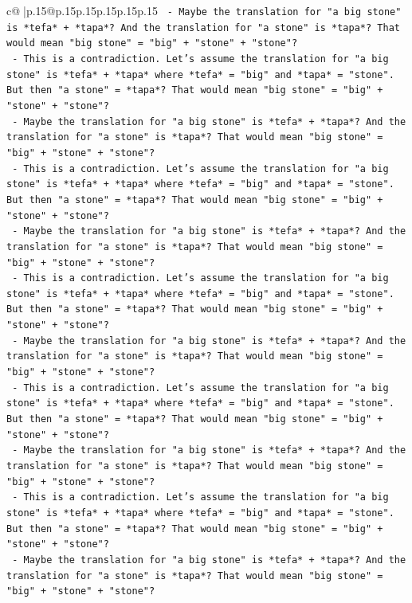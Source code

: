 \documentclass{article}
\begin{document}
{\begin{supertabular}{c@{$\;$}|p{.15\linewidth}@{}p{.15\linewidth}p{.15\linewidth}p{.15\linewidth}p{.15\linewidth}p{.15\linewidth}}
{{{\texttt{        {-} Maybe the translation for "a big stone" is *tefa* + *tapa*? And the translation for "a stone" is *tapa*? That would mean "big stone" = "big" + "stone" + "stone"?} \\
\texttt{        {-} This is a contradiction. Let's assume the translation for "a big stone" is *tefa* + *tapa* where *tefa* = "big" and *tapa* = "stone". But then "a stone" = *tapa*? That would mean "big stone" = "big" + "stone" + "stone"?} \\
\texttt{        {-} Maybe the translation for "a big stone" is *tefa* + *tapa*? And the translation for "a stone" is *tapa*? That would mean "big stone" = "big" + "stone" + "stone"?} \\
\texttt{        {-} This is a contradiction. Let's assume the translation for "a big stone" is *tefa* + *tapa* where *tefa* = "big" and *tapa* = "stone". But then "a stone" = *tapa*? That would mean "big stone" = "big" + "stone" + "stone"?} \\
\texttt{        {-} Maybe the translation for "a big stone" is *tefa* + *tapa*? And the translation for "a stone" is *tapa*? That would mean "big stone" = "big" + "stone" + "stone"?} \\
\texttt{        {-} This is a contradiction. Let's assume the translation for "a big stone" is *tefa* + *tapa* where *tefa* = "big" and *tapa* = "stone". But then "a stone" = *tapa*? That would mean "big stone" = "big" + "stone" + "stone"?} \\
\texttt{        {-} Maybe the translation for "a big stone" is *tefa* + *tapa*? And the translation for "a stone" is *tapa*? That would mean "big stone" = "big" + "stone" + "stone"?} \\
\texttt{        {-} This is a contradiction. Let's assume the translation for "a big stone" is *tefa* + *tapa* where *tefa* = "big" and *tapa* = "stone". But then "a stone" = *tapa*? That would mean "big stone" = "big" + "stone" + "stone"?} \\
\texttt{        {-} Maybe the translation for "a big stone" is *tefa* + *tapa*? And the translation for "a stone" is *tapa*? That would mean "big stone" = "big" + "stone" + "stone"?} \\
\texttt{        {-} This is a contradiction. Let's assume the translation for "a big stone" is *tefa* + *tapa* where *tefa* = "big" and *tapa* = "stone". But then "a stone" = *tapa*? That would mean "big stone" = "big" + "stone" + "stone"?} \\
\texttt{        {-} Maybe the translation for "a big stone" is *tefa* + *tapa*? And the translation for "a stone" is *tapa*? That would mean "big stone" = "big" + "stone" + "stone"?} \\
}}}
\end{supertabular}}
\end{document}
